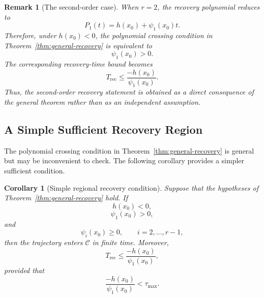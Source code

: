 \documentclass[11pt]{article}
\newtheorem{corollary}{Corollary}
\newtheorem{remark}{Remark}
\newcommand{\safeSet}{\mathcal{C}}
\newcommand{\Trec}{T_{\mathrm{rec}}}
\newcommand{\taumax}{\tau_{\max}}
\begin{document}
\begin{remark}[The second-order case]
When $r=2$, the recovery polynomial reduces to
\begin{equation}
P_1(t)
=
h(x_0)+\psi_1(x_0)t.
\end{equation}
Therefore, under $h(x_0)<0$, the polynomial crossing condition in Theorem~\ref{thm:general-recovery} is equivalent to
\begin{equation}
\psi_1(x_0)>0.
\end{equation}
The corresponding recovery-time bound becomes
\begin{equation}
\Trec
\le
\frac{-h(x_0)}{\psi_1(x_0)}.
\end{equation}
Thus, the second-order recovery statement is obtained as a direct consequence of the general theorem rather than as an independent assumption.
\end{remark}

\subsection{A Simple Sufficient Recovery Region}

The polynomial crossing condition in Theorem~\ref{thm:general-recovery} is general but may be inconvenient to check. The following corollary provides a simpler sufficient condition.

\begin{corollary}[Simple regional recovery condition]
\label{cor:simple-region}
Suppose that the hypotheses of Theorem~\ref{thm:general-recovery} hold. If
\begin{equation}
h(x_0)<0,
\label{eq:simple-h-negative}
\end{equation}
\begin{equation}
\psi_1(x_0)>0,
\label{eq:simple-psi-one-positive}
\end{equation}
and
\begin{equation}
\psi_i(x_0)\ge0,
\qquad i=2,\dots,r-1,
\label{eq:simple-higher-nonnegative}
\end{equation}
then the trajectory enters $\safeSet$ in finite time. Moreover,
\begin{equation}
\Trec
\le
\frac{-h(x_0)}{\psi_1(x_0)},
\label{eq:simple-time-bound}
\end{equation}
provided that
\begin{equation}
\frac{-h(x_0)}{\psi_1(x_0)}<\taumax.
\label{eq:simple-time-existence}
\end{equation}
\end{corollary}
\end{document}
